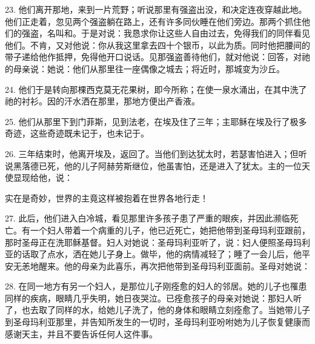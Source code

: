 23. 他们离开那地，来到一片荒野；听说那里有强盗出没，和决定连夜穿越此地。他们正走着，忽见两个强盗躺在路上，还有许多同伙睡在他们旁边。那两个抓住他们的强盗，名叫和。于是对说：我恳求你让这些人自由过去，免得我们的同伴看见他们。不肯，又对他说：你从我这里拿去四十个银币，以此为质。同时他把腰间的带子递给他作抵押，免得他开口说话。见那强盗善待他们，就对他说：回答，对祂的母亲说：她说：他们从那里往一座偶像之城去；将近时，那城变为沙丘。\par

24. 他们于是转向那棵西克莫无花果树，即今所称；在使一泉水涌出，在其中洗了祂的衬衫。因的汗水洒在那里，那地方便出产香液。\par

25. 他们从那里下到门菲斯，见到法老，在埃及住了三年；主耶稣在埃及行了极多奇迹，这些奇迹既未记于，也未记于。\par

26. 三年结束时，他离开埃及，返回了。当他们到达犹太时，若瑟害怕进入；但听说黑落德已死，他的儿子阿赫劳斯继位，他虽害怕，还是进入了犹太。主的一位天使显现给他，说：\par

实在是奇妙，世界的主竟这样被抱着在世界各地行走！\par

27. 此后，他们进入白冷城，看见那里许多孩子患了严重的眼疾，并因此濒临死亡。有一个妇人带着一个病重的儿子，他已近死亡，她把他带到圣母玛利亚跟前，那时圣母正在洗耶稣基督。妇人对她说：圣母玛利亚听了，说：妇人便照圣母玛利亚的话取了点水，洒在她儿子身上。做毕，他的病情减轻了；睡了一会儿后，他平安无恙地醒来。他的母亲为此喜乐，再次把他带到圣母玛利亚面前。圣母对她说：\par

28. 在同一地方有另一个妇人，是那位儿子刚痊愈的妇人的邻居。她的儿子也罹患同样的疾病，眼睛几乎失明，她日夜哭泣。已痊愈孩子的母亲对她说：那妇人听了，也去取了同样的水，给她儿子洗了，他的身体和眼睛立刻痊愈了。当她带儿子到圣母玛利亚那里，并告知所发生的一切时，圣母玛利亚吩咐她为儿子恢复健康而感谢天主，并且不要告诉任何人这件事。\par

